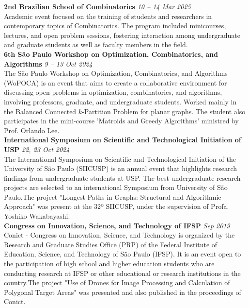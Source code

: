 \documentclass[a4paper,10pt]{article}
\begin{document}
\noindent\textbf{2nd Brazilian School of Combinatorics} \hfill \textit{10 -- 14 Mar 2025}\\
Academic event focused on the training of students and researchers in contemporary topics of Combinatorics. The program included minicourses, lectures, and open problem sessions, fostering interaction among undergraduate and graduate students as well as faculty members in the field. \\

\noindent\textbf{6th São Paulo Workshop on Optimization, Combinatorics, and Algorithms} \hfill \textit{9 -- 13 Oct 2024}\\
The São Paulo Workshop on Optimization, Combinatorics, and Algorithms (WoPOCA) is an event that aims to create a collaborative environment for discussing open problems in optimization, combinatorics, and algorithms, involving professors, graduate, and undergraduate students. Worked mainly in the Balanced Connected \(k\)-Partition Problem for planar graphs. The student also participates in the mini-course 'Matroids and Greedy Algorithms' ministred by Prof. Orlando Lee. \\

\noindent\textbf{International Symposium on Scientific and Technological Initiation of USP} \hfill \textit{22, 23 Oct 2024}\\
The International Symposium on Scientific and Technological Initiation of the University of São Paulo (SIICUSP) is an annual event that highlights research findings from undergraduate students at USP. The best undergraduate research projects are selected to an international Symposium from University of São Paulo.The project "Longest Paths in Graphs: Structural and Algorithmic Approach" was present at the 32º SIICUSP, under the supervision of Profa. Yoshiko Wakabayashi. \\

\noindent\textbf{Congress on Innovation, Science, and Technology of IFSP} \hfill \textit{Sep 2019}\\
Conict - Congress on Innovation, Science, and Technology is organized by the Research and Graduate Studies Office (PRP) of the Federal Institute of Education, Science, and Technology of São Paulo (IFSP). It is an event open to the participation of high school and higher education students who are conducting research at IFSP or other educational or research institutions in the country.The project "Use of Drones for Image Processing and Calculation of Polygonal Target Areas" was presented and also published in the proceedings of Conict. \\
\end{document}
